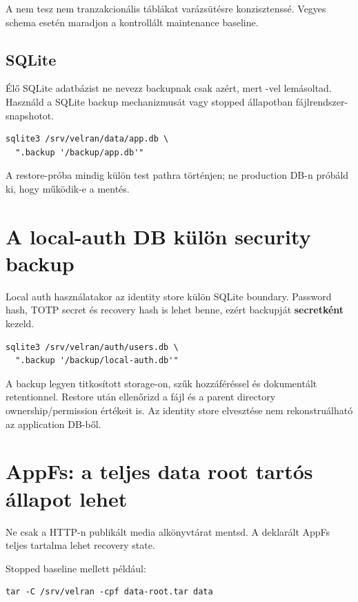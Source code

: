 A  nem tesz nem tranzakcionális táblákat varázsütésre konzisztenssé. Vegyes schema esetén maradjon a kontrollált maintenance baseline.

\subsection*{SQLite}

Élő SQLite adatbázist ne nevezz backupnak csak azért, mert -vel lemásoltad. Használd a SQLite backup mechanizmusát vagy stopped állapotban fájlrendszer-snapshotot.

\begin{lstlisting}
sqlite3 /srv/velran/data/app.db \
  ".backup '/backup/app.db'"
\end{lstlisting}

A restore-próba mindig külön test pathra történjen; ne production DB-n próbáld ki, hogy működik-e a mentés.

\section{A local-auth DB külön security backup}

Local auth használatakor az identity store külön SQLite boundary. Password hash, TOTP secret és recovery hash is lehet benne, ezért backupját \textbf{secretként} kezeld.

\begin{lstlisting}
sqlite3 /srv/velran/auth/users.db \
  ".backup '/backup/local-auth.db'"
\end{lstlisting}

A backup legyen titkosított storage-on, szűk hozzáféréssel és dokumentált retentionnel. Restore után ellenőrizd a fájl és a parent directory ownership/permission értékeit is. Az identity store elvesztése nem rekonstruálható az application DB-ből.

\section{AppFs: a teljes data root tartós állapot lehet}

Ne csak a HTTP-n publikált media alkönyvtárat mentsd. A deklarált AppFs  teljes tartalma lehet recovery state.

Stopped baseline mellett például:

\begin{lstlisting}
tar -C /srv/velran -cpf data-root.tar data
\end{lstlisting}


